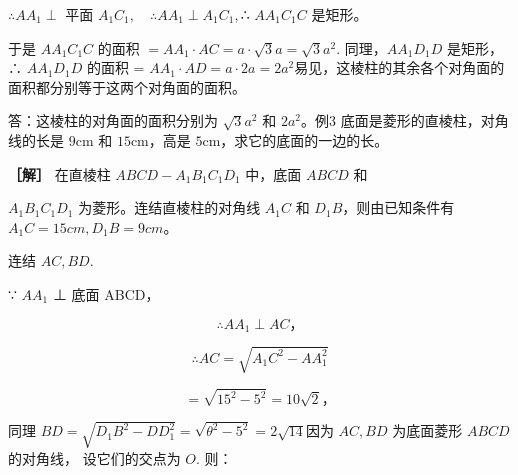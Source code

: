 \(\therefore AA_{1}\perp\) 平面
\(A_{1}C_{1},\quad\therefore AA_{1}\perp A_{1}C_{1},\)∴ \(AA_{1}C_{1}C\)
是矩形。

于是 \(AA_{1}C_{1}C\) 的面积
\(= AA_{1} \cdot AC = a \cdot \sqrt{3} a = \sqrt{3} a^{2}\).
同理，\(AA_{1}D_{1}D\) 是矩形，∴ \(AA_{1}D_{1}D\) 的面积 =
\(AA_{1} \cdot AD = a \cdot 2a = 2a^{2}\)易见，这棱柱的其余各个对角面的面积都分别等于这两个对角面的面积。

答：这棱柱的对角面的面积分别为 \(\sqrt{3} a^2\) 和 \(2a^2\)。例3
底面是菱形的直棱柱，对角线的长是 \(9\mathrm{cm}\) 和
\(15\mathrm{cm}\)，高是 \(5\mathrm{cm}\)，求它的底面的一边的长。

\textbf{［解］} 在直棱柱 \(ABCD - A_{1}B_{1}C_{1}D_{1}\) 中，底面
\(ABCD\) 和

\(A_{1}B_{1}C_{1}D_{1}\) 为菱形。连结直棱柱的对角线 \(A_{1}C\) 和
\(D_{1}B\)，则由已知条件有 \(A_{1}C=15cm, D_{1}B=9cm\)。

连结 \(AC, BD\).

∵ \(AA_{1}\) ⊥ 底面 ABCD，

\[
\therefore A A _ {1} \perp A C\text{，}
\]

\[
\therefore A C = \sqrt {A _ {1} C ^ {2} - A A _ {1} ^ {2}}
\]

\[
= \sqrt {15^{2} - 5^{2}} = 10 \sqrt {2}\text{，}
\]

同理
\(BD = \sqrt{D_1B^2 - DD_1^2} = \sqrt{\theta^2 - 5^2} = 2\sqrt{14}\)因为
\(AC, BD\) 为底面菱形 \(ABCD\) 的对角线， 设它们的交点为 \(O\). 则：

